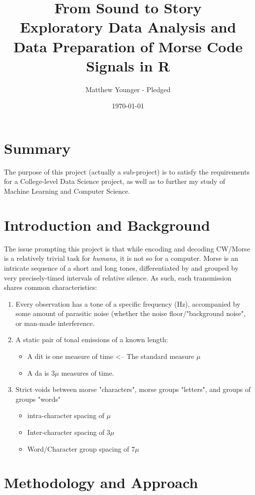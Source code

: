 \documentclass[11pt]{article}
\author{Matthew Younger - Pledged}
\date{\today}
\title{From Sound to Story\\\medskip
\large Exploratory Data Analysis and Data Preparation of Morse Code Signals in R}
\begin{document}
\maketitle
\setcounter{tocdepth}{2}
\tableofcontents

\section{Summary}
\label{sec:org568b73b}
The purpose of this project (actually a sub-project) is to satisfy the requirements for a College-level
Data Science project, as well as to further my study of Machine Learning and Computer Science.
\section{Introduction and Background}
\label{sec:orgb6391be}
The issue prompting this project is that while encoding and decoding CW/Morse is a relatively trivial task for \emph{humans,}
it is not so for a computer. Morse is an intricate sequence of a short and long tones, differentiated by and grouped by
very precisely-timed intervals of relative silence. As such, each transmission shares common characteristics:

\begin{enumerate}
\item Every observation has a tone of a specific frequency (Hz), accompanied by some amount of parasitic noise
(whether the noise floor/"background noise", or man-made interference.

\item A static pair of tonal emissions of a known length:
\begin{itemize}
\item A dit is one measure of time <-- The standard measure \(\mu\)
\item A da is 3\(\mu\) measures of time.
\end{itemize}

\item Strict voids between morse "characters", morse groups "letters", and groups of groups "words"
\begin{itemize}
\item intra-character spacing of \(\mu\)
\item Inter-character spacing of 3\(\mu\)
\item Word/Character group spacing of 7\(\mu\)
\end{itemize}
\end{enumerate}
\section{Methodology and Approach}
\label{sec:orgdddf39a}
\end{document}
